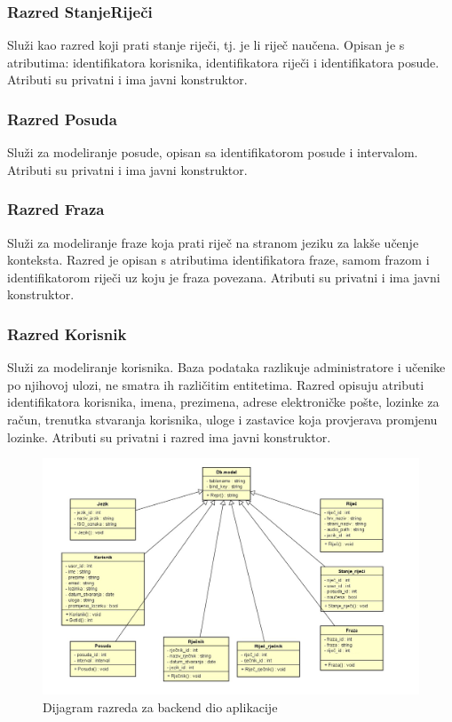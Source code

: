 \subsubsection{Razred StanjeRiječi}

Služi kao razred koji prati stanje riječi, tj. je li riječ naučena. Opisan je s atributima: identifikatora korisnika, identifikatora riječi i identifikatora posude. Atributi su privatni i ima javni konstruktor.

\subsubsection{Razred Posuda}

Služi za modeliranje posude, opisan sa identifikatorom posude i intervalom.
Atributi su privatni i ima javni konstruktor.

\subsubsection{Razred Fraza}

Služi za modeliranje fraze koja prati riječ na stranom jeziku za lakše
učenje konteksta. Razred je opisan s atributima identifikatora fraze, samom frazom i identifikatorom riječi uz koju je fraza povezana. Atributi su privatni i ima javni konstruktor.


\subsubsection{Razred Korisnik}

Služi za modeliranje korisnika. Baza podataka razlikuje administratore i učenike po njihovoj ulozi,
ne smatra ih različitim entitetima. Razred opisuju atributi identifikatora korisnika, imena, prezimena,
adrese elektroničke pošte, lozinke za račun, trenutka stvaranja korisnika, uloge i zastavice
koja provjerava promjenu lozinke. Atributi su privatni i razred ima javni konstruktor.

\begin{figure}[H]
	\includegraphics[scale=0.35]{dijagrami/class_back.jpeg}
	\centering
	\caption{Dijagram razreda za backend dio aplikacije}
	\label{fig:class-back}
\end{figure}

